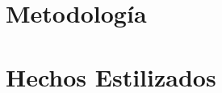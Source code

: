 \documentclass[12pt]{article}
\begin{document}
\section{Metodología}





\section{Hechos Estilizados}




\newpage


\end{document}
